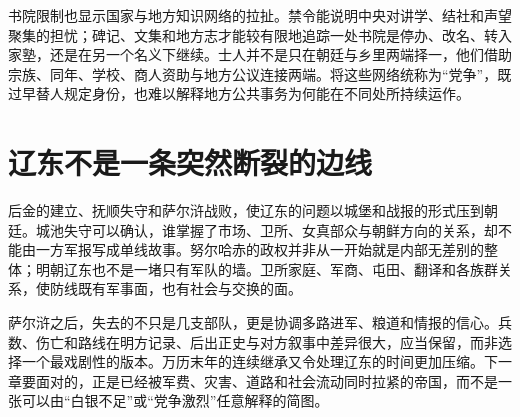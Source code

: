 书院限制也显示国家与地方知识网络的拉扯。禁令能说明中央对讲学、结社和声望聚集的担忧；碑记、文集和地方志才能较有限地追踪一处书院是停办、改名、转入家塾，还是在另一个名义下继续。士人并不是只在朝廷与乡里两端择一，他们借助宗族、同年、学校、商人资助与地方公议连接两端。将这些网络统称为“党争”，既过早替人规定身份，也难以解释地方公共事务为何能在不同处所持续运作。

\section{辽东不是一条突然断裂的边线}
\label{sec:wanli-liaodong}

后金的建立、抚顺失守和萨尔浒战败，使辽东的问题以城堡和战报的形式压到朝廷。城池失守可以确认，谁掌握了市场、卫所、女真部众与朝鲜方向的关系，却不能由一方军报写成单线故事。努尔哈赤的政权并非从一开始就是内部无差别的整体；明朝辽东也不是一堵只有军队的墙。卫所家庭、军商、屯田、翻译和各族群关系，使防线既有军事面，也有社会与交换的面。

萨尔浒之后，失去的不只是几支部队，更是协调多路进军、粮道和情报的信心。兵数、伤亡和路线在明方记录、后出正史与对方叙事中差异很大，应当保留，而非选择一个最戏剧性的版本。万历末年的连续继承又令处理辽东的时间更加压缩。下一章要面对的，正是已经被军费、灾害、道路和社会流动同时拉紧的帝国，而不是一张可以由“白银不足”或“党争激烈”任意解释的简图。

